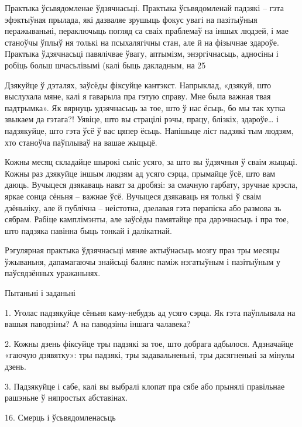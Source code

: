 Практыка ўсьвядомленае ўдзячнасьці. Практыка ўсьвядомленай падзякі – гэта эфэктыўная прылада, які дазваляе зрушыць фокус увагі на пазітыўныя перажываньні, пераключыць погляд са сваіх праблемаў на іншых людзей, і мае станоўчы ўплыў ня толькі на псыхалягічны стан, але й на фізычнае здароўе. Практыка ўдзячнасьці павялічвае ўвагу, аптымізм, энэргічнасьць, адносіны і робіць больш шчасьлівымі (калі быць дакладным, на 25%

Дзякуйце ў дэталях, заўсёды фіксуйце кантэкст. Напрыклад, «дзякуй, што выслухала мяне, калі я гаварыла пра гэтую справу. Мне была важная твая падтрымка». Як вярнуць удзячнасьць за тое, што ў нас ёсьць, бо мы так хутка звыкаем да гэтага?! Уявіце, што вы страцілі рэчы, працу, блізкіх, здароўе… і падзякуйце, што гэта ўсё ў вас цяпер ёсьць. Напішыце ліст падзякі тым людзям, хто станоўча паўплываў на вашае жыцьцё.

Кожны месяц складайце шырокі сьпіс усяго, за што вы ўдзячныя ў сваім жыцьці. Кожны раз дзякуйце іншым людзям ад усяго сэрца, прымайце ўсё, што вам даюць. Вучыцеся дзякаваць нават за дробязі: за смачную гарбату, зручнае крэсла, яркае сонца сёньня – важнае ўсё. Вучыцеся дзякаваць ня толькі ў сваім дзёньніку, але й публічна – неістотна, дзелавая гэта перапіска або размова зь сябрам. Рабіце камплімэнты, але заўсёды памятайце пра дарэчнасьць і пра тое, што падзяка павінна быць тонкай і далікатнай.

Рэгулярная практыка ўдзячнасьці мяняе актыўнасьць мозгу праз тры месяцы ўжываньня, дапамагаючы знайсьці балянс паміж нэгатыўным і пазітыўным у паўсядзённых уражаньнях.

Пытаньні і заданьні

1. Уголас падзякуйце сёньня каму-небудзь ад усяго сэрца. Як гэта паўплывала на вашыя паводзіны? А на паводзіны іншага чалавека?

2. Кожны дзень фіксуйце тры падзякі за тое, што добрага адбылося. Адзначайце «гаючую дзявятку»: тры падзякі, тры задавальненьні, тры дасягненьні за мінулы дзень.

3. Падзякуйце і сабе, калі вы выбралі клопат пра сябе або прынялі правільнае рашэньне ў няпростых абставінах.


16. Смерць і ўсьвядомленасьць

